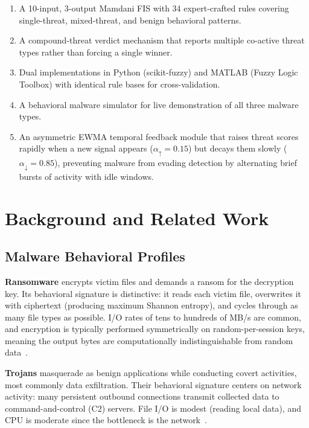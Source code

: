 \documentclass[conference]{IEEEtran}
\begin{document}
\begin{enumerate}[leftmargin=1.8em]
  \item A 10-input, 3-output Mamdani FIS with 34 expert-crafted rules
        covering single-threat, mixed-threat, and benign behavioral
        patterns.
  \item A compound-threat verdict mechanism that reports multiple co-active
        threat types rather than forcing a single winner.
  \item Dual implementations in Python (scikit-fuzzy) and MATLAB (Fuzzy
        Logic Toolbox) with identical rule bases for cross-validation.
  \item A behavioral malware simulator for live demonstration of all three
        malware types.
  \item An asymmetric EWMA temporal feedback module that raises threat
        scores rapidly when a new signal appears ($\alpha_{\uparrow}=0.15$)
        but decays them slowly ($\alpha_{\downarrow}=0.85$), preventing
        malware from evading detection by alternating brief bursts of
        activity with idle windows.
\end{enumerate}

\section{Background and Related Work}

\subsection{Malware Behavioral Profiles}

\textbf{Ransomware} encrypts victim files and demands a ransom for the
decryption key. Its behavioral signature is distinctive: it reads each
victim file, overwrites it with ciphertext (producing maximum Shannon
entropy), and cycles through as many file types as possible. I/O rates
of tens to hundreds of MB/s are common, and encryption is typically
performed symmetrically on random-per-session keys, meaning the output
bytes are computationally indistinguishable from random
data~\cite{kharaz2016unveil}.

\textbf{Trojans} masquerade as benign applications while conducting
covert activities, most commonly data exfiltration. Their behavioral
signature centers on network activity: many persistent outbound connections
transmit collected data to command-and-control (C2) servers. File I/O
is modest (reading local data), and CPU is moderate since the bottleneck
is the network~\cite{egele2012survey}.
\end{document}
